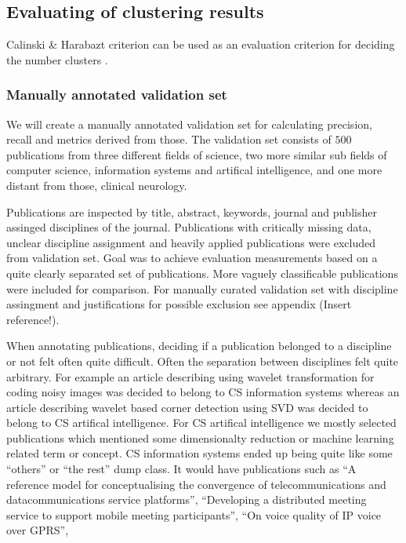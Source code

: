 \subsection{Evaluating of clustering results}
Calinski \& Harabazt criterion can be used as an evaluation 
criterion for deciding the number clusters . 

\subsubsection{Manually annotated validation set}
We will create a manually annotated validation set for calculating
precision, recall and metrics derived from those. The validation
set consists of $500$ publications from three different fields of
science, two more similar sub fields of computer science, 
information systems and artifical intelligence, and one more
distant from those, clinical neurology.

Publications are inspected by title, abstract, keywords, journal
and publisher assinged disciplines of the journal. Publications
with critically missing data, unclear discipline assignment and
heavily applied publications were excluded from validation set.
Goal was to achieve evaluation measurements based on a quite 
clearly separated set of publications. More vaguely classificable
publications were included for comparison. For manually curated 
validation set with discipline assingment and justifications for
possible exclusion see appendix (Insert reference!).

When annotating publications, deciding if a publication belonged to
a discipline or not felt often quite difficult. Often the 
separation between disciplines felt quite arbitrary. For example
an article describing using wavelet transformation for coding noisy
images was decided to belong to CS information systems whereas an
article describing wavelet based corner detection using SVD was
decided to belong to CS artifical intelligence.
For CS artifical intelligence we mostly selected publications which
mentioned some dimensionalty reduction or machine learning related
term or concept.
CS information systems ended up being quite like some ``others'' or
``the rest'' dump class. It would have publications such as
``A reference model for conceptualising the convergence of 
telecommunications and datacommunications service platforms'',
``Developing a distributed meeting service to support mobile 
meeting participants'',
``On voice quality of IP voice over GPRS'',
